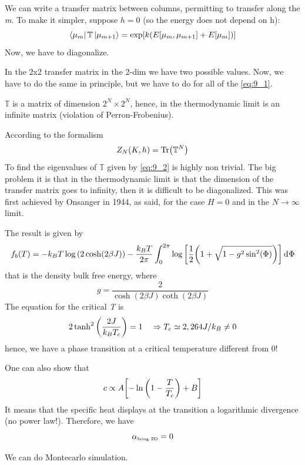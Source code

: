\documentclass[../main/main.tex]{subfiles}
\begin{document}
We can write a transfer matrix between columns, permitting to transfer along the \emph{m}. To make it simpler, suppose \( h=0 \) (so the energy does not depend on h):
\begin{equation}
  \bra{\mu _m} \mathbb{T} \ket{\mu _{m+1}} = \exp [ k(E [\mu _m, \mu _{m+1}] + E [ \mu _m])]
  \label{eq:9_2}
\end{equation}
Now, we have to diagonalize. 
\begin{remark}
In the 2x2 transfer matrix in the 2-dim we have two possible values. Now, we have to do the same in principle, but we have to do for all of the \eqref{eq:9_1}.
\end{remark}
\begin{remark}
\( \mathbb{T} \) is a matrix of dimension \( 2^N \times 2^N \), hence, in the thermodynamic limit is an infinite matrix (violation of Perron-Frobenius).
\end{remark}
According to the formalism
\begin{equation*}
  Z_{N} (K,h) = \Tr(\mathbb{T}^N)
\end{equation*}
To find the eigenvalues of \( \mathbb{T} \) given by  \eqref{eq:9_2} is highly non trivial. The big problem it is that in the thermodynamic limit is that the dimension of the transfer matrix goes to infinity, then it is difficult to be diagonalized. This was first achieved by Onsanger in 1944, as said, for the case \( H=0 \) and in the \( N \rightarrow \infty  \) limit. 

The result is given by
\begin{equation}
  f_b (T) = -k_B T \log{\qty(2 \cosh(2 \beta J))- \frac{k_B T}{2 \pi} \int_{0}^{2\pi} \log{\qty[\frac{1}{2}\qty(1+ \sqrt{1-g^2 \sin^2(\Phi) } )] } \dd[]{\Phi }  }
\end{equation}
that is the density bulk free energy, where
\begin{equation}
  g = \frac{2}{\cosh(2 \beta J)\coth(2 \beta J)}
\end{equation}
The equation for the critical \emph{T} is
\begin{equation*}
  2 \tanh^2 \qty(\frac{2J}{k_B T_c}) = 1 \quad \Rightarrow T_c \simeq 2,264 J/k_B \neq 0
\end{equation*}
hence, we have a phase transition at a critical temperature different from 0!

One can also show that
\begin{equation*}
  c \propto A \qty[-\ln{\qty(1- \frac{T}{T_c}) } + B  ]
\end{equation*}
It means that the specific heat displays at the transition a logarithmic divergence (no power law!). Therefore, we have
\begin{equation*}
\alpha _{\text{\tiny Ising 2D}} =0
\end{equation*}
\begin{remark}
We can do Montecarlo simulation.
\end{remark}
\end{document}

